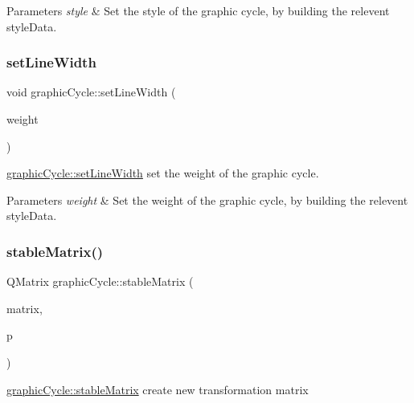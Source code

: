 \begin{DoxyParams}{Parameters}
{\em style} & Set the style of the graphic cycle, by building the relevent style\+Data. \\
\hline
\end{DoxyParams}
\mbox{\label{classgraphic_cycle_aa02ce6a22ddb0ae859ab6dac49a0570a}} 
\subsubsection{\texorpdfstring{set\+Line\+Width}{setLineWidth}}
{\footnotesize\ttfamily void graphic\+Cycle\+::set\+Line\+Width (\begin{DoxyParamCaption}\item[{double}]{weight }\end{DoxyParamCaption})\hspace{0.3cm}{\ttfamily [slot]}}



\mbox{\hyperlink{classgraphic_cycle_aa02ce6a22ddb0ae859ab6dac49a0570a}{graphic\+Cycle\+::set\+Line\+Width}} set the weight of the graphic cycle. 


\begin{DoxyParams}{Parameters}
{\em weight} & Set the weight of the graphic cycle, by building the relevent style\+Data. \\
\hline
\end{DoxyParams}
\mbox{\label{classgraphic_cycle_a1c3a094ad53a3705019c24869340ed51}} 
\subsubsection{\texorpdfstring{stable\+Matrix()}{stableMatrix()}}
{\footnotesize\ttfamily Q\+Matrix graphic\+Cycle\+::stable\+Matrix (\begin{DoxyParamCaption}\item[{const Q\+Matrix \&}]{matrix,  }\item[{const Q\+PointF \&}]{p }\end{DoxyParamCaption})}



\mbox{\hyperlink{classgraphic_cycle_a1c3a094ad53a3705019c24869340ed51}{graphic\+Cycle\+::stable\+Matrix}} create new transformation matrix 


